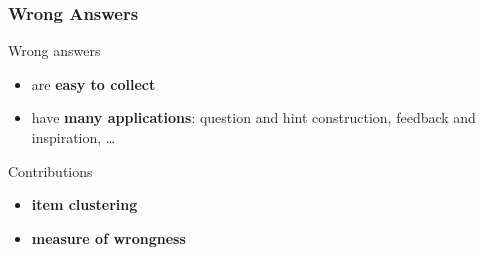 \documentclass[xcolor=svgnames]{beamer}
\begin{document}
\begin{frame}
    \frametitle{Wrong Answers}
    \huge
    Wrong answers
    \Large
    \begin{itemize}
        \item are \textbf{easy to collect}
        \item have \textbf{many applications}: question and hint construction, feedback and inspiration, \dots
    \end{itemize}
    Contributions
    \begin{itemize}
        \item \textbf{item clustering}
        \item \textbf{measure of wrongness}
    \end{itemize}
\end{frame}
\end{document}
